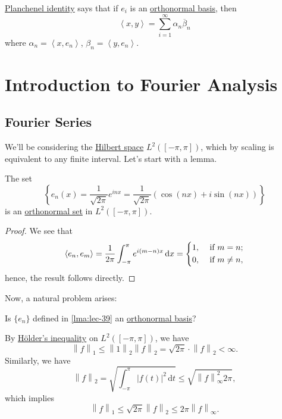 \begin{prev}
	\hyperref[note:Planchenel-identity]{Planchenel identity}  says that if \(e_{i} \) is an \hyperref[def:orthonormal-basis]{orthonormal basis},
	then
	\[
		\left< x, y \right> = \sum_{i=1}^{\infty} \alpha _{n} \overline{\beta} _n
	\]
	where \(\alpha _n = \left< x, e_{n}  \right> \), \(\beta _n = \left< y, e_{n}  \right> \).
\end{prev}

\chapter{Introduction to Fourier Analysis}
\section{Fourier Series}
We'll be considering the \hyperref[def:Hilbert-space]{Hilbert space} \(L^2([-\pi , \pi ])\), which by scaling is equivalent to
any finite interval. Let's start with a lemma.
\begin{lemma}\label{lma:lec-39}
	The set
	\[
		\left\{e_{n} (x) = \frac{1}{\sqrt{2\pi } }e^{inx} = \frac{1}{\sqrt{2\pi }}\left(\cos (nx) + i\sin (nx)\right)\right\}
	\]
	is an \hyperref[def:orthonormal-set]{orthonormal set} in \(L^2([-\pi , \pi ])\).
\end{lemma}
\begin{proof}
	We see that
	\[
		\left< e_{n} , e_{m}  \right> = \frac{1}{2\pi } \int_{-\pi}^{\pi } e^{i(m-n)x} \,\mathrm{d}x = \begin{dcases}
			1, & \text{ if } m = n ;    \\
			0, & \text{ if } m \neq n ,
		\end{dcases}
	\]
	hence, the result follows directly.
\end{proof}

Now, a natural problem arises:
\begin{problem}
Is \(\{e_{n} \}\) defined in \autoref{lma:lec-39} an \hyperref[def:orthonormal-basis]{orthonormal basis}?
\end{problem}
\begin{answer}
	By \hyperref[thm:Holder-inequality]{Hölder's inequality} on \(L^{2} ([-\pi , \pi ])\), we have
	\[
		\left\lVert f\right\rVert _1 \leq \left\lVert 1\right\rVert _2 \left\lVert f\right\rVert _2 = \sqrt{2\pi } \cdot \left\lVert f\right\rVert _2 < \infty .
	\]
	Similarly, we have
	\[
		\left\lVert f\right\rVert _2 = \sqrt{\int_{-\pi}^{\pi} \left\vert f(t) \right\vert ^{2} \,\mathrm{d}t} \leq \sqrt{\left\lVert f\right\rVert ^{2} _\infty 2\pi },
	\]
	which implies
	\[
		\left\lVert f\right\rVert _1 \leq \sqrt{2\pi } \left\lVert f\right\rVert _2 \leq 2\pi \left\lVert f\right\rVert _\infty .
	\]
\end{answer}

